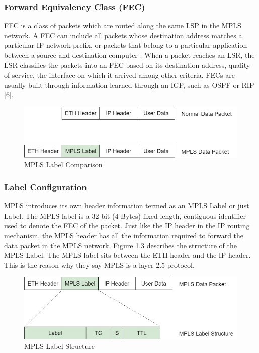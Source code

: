 \subsubsection{Forward Equivalency Class (FEC)}
FEC is a class of packets which are routed along the same LSP in the MPLS network. A FEC can include all packets whose destination address matches a particular IP network prefix, or packets that belong to a particular application between a source and destination computer \cite{pise2005packet}. When a packet reaches an LSR, the LSR classifies the packets into an FEC based on its destination address, quality of service, the interface on which it arrived among other criteria. FECs are usually built through information learned through an IGP, such as OSPF or RIP [6].

\begin{figure}[H]
       \centering\includegraphics[width=\textwidth]{images/3_MPLS_Label_comparison.jpg}
       \caption{MPLS Label Comparison}
       \label{fig:compbest}
\end{figure}

\subsubsection{Label Configuration}
MPLS introduces its own header information termed as an MPLS Label or just Label. The MPLS label is a 32 bit (4 Bytes) fixed length, contiguous identifier used to denote the FEC of the packet. Just like the IP header in the IP routing mechanism, the MPLS header has all the information required to forward the data packet in the MPLS network. Figure 1.3 describes the structure of the MPLS Label. The MPLS label sits between the ETH header and the IP header. This is the reason why they say MPLS is a layer 2.5 protocol.

\begin{figure}[H]
       \centering\includegraphics[width=\textwidth]{images/4_MPLS_Label_Structure.jpg}
       \caption{MPLS Label Structure}
       \label{fig:compbest}
\end{figure}

